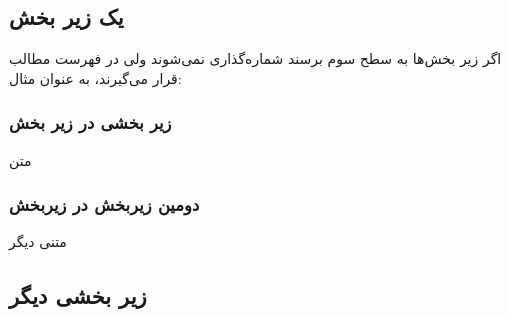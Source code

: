 \subsection{یک زیر بخش}
اگر زیر بخش‌ها به سطح سوم برسند شماره‌گذاری نمی‌شوند ولی در فهرست مطالب قرار می‌گیرند، به عنوان مثال:
\subsubsection{زیر بخشی در زیر بخش}
متن
\subsubsection{ دومین زیربخش در زیربخش}
متنی دیگر

\subsection{زیر بخشی دیگر}
